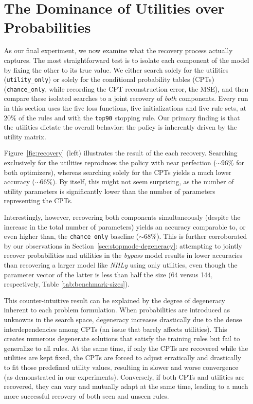 \section{The Dominance of Utilities over Probabilities}
\label{sec:loss}
As our final experiment, we now examine what the recovery process actually captures. The most straightforward test is to isolate each component of the model by fixing the other to its true value. We either search solely for the utilities (\texttt{utility\_only}) or solely for the conditional probability tables (CPTs) (\texttt{chance\_only}, while recording the CPT reconstruction error, the MSE), and then compare these isolated searches to a joint recovery of \emph{both} components. Every run in this section uses the five loss functions, five initializations and five rule sets, at $20\%$ of the rules and with the \texttt{top90} stopping rule. Our primary finding is that the utilities dictate the overall behavior: the policy is inherently driven by the utility matrix.

Figure~\ref{fig:recovery} (left) illustrates the result of the each recovery. Searching exclusively for the utilities reproduces the policy with near perfection ($\sim\!96\%$ for both optimizers), whereas searching solely for the CPTs yields a much lower accuracy ($\sim\!66\%$). By itself, this might not seem surprising, as the number of utility parameters is significantly lower than the number of parameters representing the CPTs. 

Interestingly, however, recovering both components simultaneously (despite the increase in the total number of parameters) yields an accuracy comparable to, or even higher than, the \texttt{chance\_only} baseline ($\sim\!68\%$). This is further corroborated by our observations in Section~\ref{sec:stopmode-degeneracy}: attempting to jointly recover probabilities and utilities in the \emph{bypass} model results in lower accuracies than recovering a larger model like \emph{NHLy} using only utilities, even though the parameter vector of the latter is less than half the size (64 versus 144, respectively, Table \ref{tab:benchmark-sizes}).

This counter-intuitive result can be explained by the degree of degeneracy inherent to each problem formulation. When probabilities are introduced as unknowns in the search space, degeneracy increases drastically due to the dense interdependencies among CPTs (an issue that barely affects utilities). This creates numerous degenerate solutions that satisfy the training rules but fail to generalize to all rules. At the same time, if only the CPTs are recovered while the utilities are kept fixed, the CPTs are forced to adjust erratically and drastically to fit those predefined utility values, resulting in slower and worse convergence (as demonstrated in our experiments). Conversely, if both CPTs and utilities are recovered, they can vary and mutually adapt at the same time, leading to a much more successful recovery of both seen and unseen rules.


